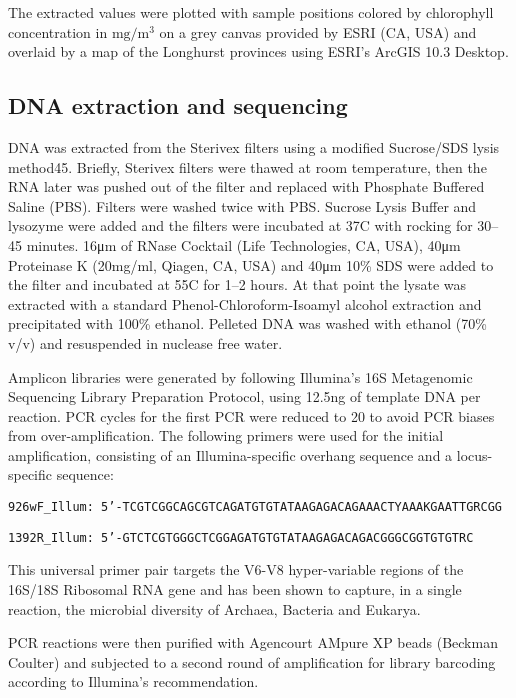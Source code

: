 The extracted values were plotted with sample positions colored by chlorophyll concentration in $\textrm{mg}/\textrm{m}^3$ on a grey canvas provided by ESRI (CA, USA) and overlaid by a map of the Longhurst provinces \cite{longhurst_estimate_1995, marineregions} using ESRI's ArcGIS 10.3 Desktop.

\subsection{DNA extraction and sequencing}

DNA was extracted from the Sterivex filters using a modified Sucrose/SDS lysis method45. Briefly, Sterivex filters were thawed at room temperature, then the RNA later was pushed out of the filter and replaced with Phosphate Buffered Saline (PBS). Filters were washed twice with PBS. Sucrose Lysis Buffer \cite{massana_vertical_1997} and lysozyme were added and the filters were incubated at 37\degree C with rocking for 30–45 minutes. 16\si{\micro\meter} of RNase Cocktail (Life Technologies, CA, USA), 40\si{\micro\meter} Proteinase K (20mg/ml, Qiagen, CA, USA) and 40\si{\micro\meter} 10\% SDS were added to the filter and incubated at 55\degree C for 1–2 hours. At that point the lysate was extracted with a standard Phenol-Chloroform-Isoamyl alcohol extraction and precipitated with 100\% ethanol. Pelleted DNA was washed with ethanol (70\% v/v) and resuspended in nuclease free water.

Amplicon libraries were generated by following Illumina's 16S Metagenomic Sequencing Library Preparation Protocol, using 12.5ng of template DNA per reaction. PCR cycles for the first PCR were reduced to 20 to avoid PCR biases from over-amplification. The following primers were used for the initial amplification, consisting of an Illumina-specific overhang sequence and a locus-specific sequence:

{\tt 926wF\_Illum: 5'-TCGTCGGCAGCGTCAGATGTGTATAAGAGACAGAAACTYAAAKGAATTGRCGG}

{\tt 1392R\_Illum: 5'-GTCTCGTGGGCTCGGAGATGTGTATAAGAGACAGACGGGCGGTGTGTRC}

\noindent This universal primer pair targets the V6-V8 hyper-variable regions of the 16S/18S Ribosomal RNA gene and has been shown to capture, in a single reaction, the microbial diversity of Archaea, Bacteria and Eukarya. \cite{wilkins_advection_2013}

PCR reactions were then purified with Agencourt AMpure XP beads (Beckman Coulter) and subjected to a second round of amplification for library barcoding according to Illumina's recommendation.

